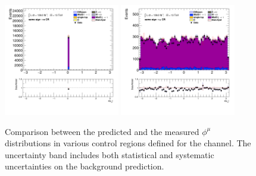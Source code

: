 \begin{figure}[!htp]
\begin{center}
			\includegraphics[width=0.45\textwidth]{chapters/chapter6_HPlus/images/taulep/mu_0_phi_SS_TAUEL.png} 
			\includegraphics[width=0.45\textwidth]{chapters/chapter6_HPlus/images/taulep/mu_0_phi_SS_TAUMU.png} \\
			\end{center}
			\caption{
			Comparison between the predicted and the measured $\phi^{\mu}$ distributions in various control regions defined for the \taulep channel. The uncertainty band includes both statistical and systematic uncertainties on the background prediction. 
			}
			\label{fig:bkg-phi-mu-taulep}
		\end{figure}

